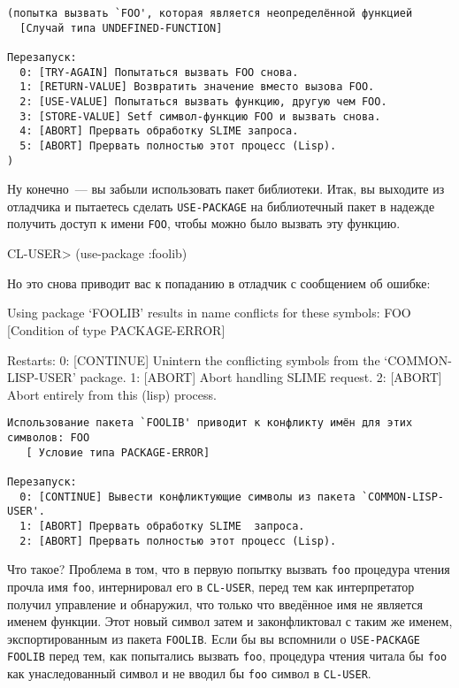 \begin{verbatim}
(попытка вызвать `FOO', которая является неопределённой функцией
  [Случай типа UNDEFINED-FUNCTION]

Перезапуск:
  0: [TRY-AGAIN] Попытаться вызвать FOO снова.
  1: [RETURN-VALUE] Возвратить значение вместо вызова FOO.
  2: [USE-VALUE] Попытаться вызвать функцию, другую чем FOO.
  3: [STORE-VALUE] Setf символ-функцию FOO и вызвать снова.
  4: [ABORT] Прервать обработку SLIME запроса.
  5: [ABORT] Прервать полностью этот процесс (Lisp).
)
\end{verbatim}

Ну конечно~--- вы забыли использовать пакет библиотеки. Итак, вы выходите из отладчика и
пытаетесь сделать \lstinline{USE-PACKAGE} на библиотечный пакет в надежде получить доступ к
имени \lstinline{FOO}, чтобы можно было вызвать эту функцию.

\begin{myverb}
CL-USER> (use-package :foolib)
\end{myverb}

Но это снова приводит вас к попаданию в отладчик с сообщением об ошибке:

\begin{myverb}
Using package `FOOLIB' results in name conflicts for these symbols: FOO
   [Condition of type PACKAGE-ERROR]

Restarts:
  0: [CONTINUE] Unintern the conflicting symbols from the `COMMON-LISP-USER' package.
  1: [ABORT] Abort handling SLIME request.
  2: [ABORT] Abort entirely from this (lisp) process.
\end{myverb}

\begin{verbatim}
Использование пакета `FOOLIB' приводит к конфликту имён для этих символов: FOO
   [ Условие типа PACKAGE-ERROR]

Перезапуск:
  0: [CONTINUE] Вывести конфликтующие символы из пакета `COMMON-LISP-USER'.
  1: [ABORT] Прервать обработку SLIME  запроса.
  2: [ABORT] Прервать полностью этот процесс (Lisp).
\end{verbatim}

Что такое? Проблема в том, что в первую попытку вызвать \lstinline{foo} процедура чтения прочла имя
\lstinline{foo}, интернировал его в \lstinline{CL-USER}, перед тем как интерпретатор получил
управление и обнаружил, что только что введённое имя не является именем функции. Этот
новый символ затем и законфликтовал с таким же именем, экспортированным из пакета
\lstinline{FOOLIB}. Если бы вы вспомнили о \lstinline{USE-PACKAGE FOOLIB} перед тем, как попытались
вызвать \lstinline{foo}, процедура чтения читала бы \lstinline{foo} как унаследованный символ и не вводил
бы \lstinline{foo} символ в \lstinline{CL-USER}.


